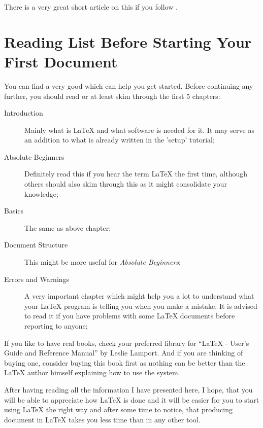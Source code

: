 \documentclass[
    draft
    ]{scrartcl}
\begin{document}
There is a very great short article on this if you follow
    .

\section{Reading List Before Starting Your First Document}

%
You can find a very good 
    which can help you get started. Before continuing any further, you should
    read or at least skim through the first 5 chapters:
\begin{description}
    \item[Introduction] Mainly what is \LaTeX{} and what software is needed for
        it. It may serve as an addition to what is already written in the
        'setup' tutorial;
    \item[Absolute Beginners] Definitely read this if you hear the term \LaTeX{} the first
        time, although others should also skim through this as it might
        consolidate your knowledge;
    \item[Basics] The same as above chapter;
    \item[Document Structure] This might be more useful for \emph{Absolute
        Beginners};
    \item[Errors and Warnings] A very important chapter which might help you a
        lot to understand what your \LaTeX{} program is telling you when you
        make a mistake. It is advised to read it if you have problems with some
        \LaTeX{} documents before reporting to anyone;
\end{description}
%
If you like to have real books, check your preferred library for
    ``\LaTeX{} - User's Guide and Reference Manual'' by Leslie Lamport.
%
And if you are thinking of buying one, consider buying this book first as
    nothing can be better than the \LaTeX{} author himself explaining how to use
    the system.

%
After having reading all the information I have presented here, I hope, that you
    will be able to appreciate how \LaTeX{} is done and it will be easier for you
    to start using \LaTeX{} the right way and after some time to notice, that
    producing document in \LaTeX{} takes you less time than in any other tool.
\end{document}
